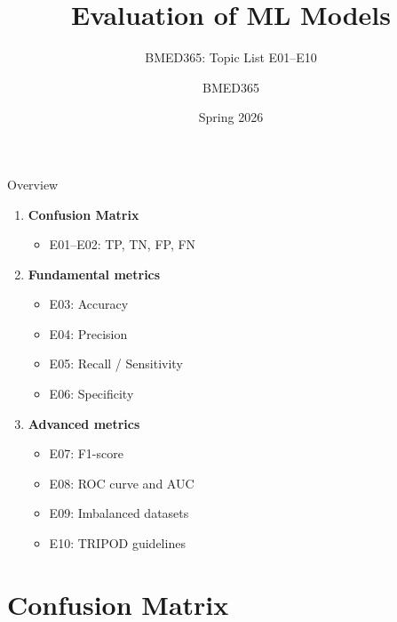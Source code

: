 \documentclass[aspectratio=169, 10pt]{beamer}
\title{Evaluation of ML Models}
\subtitle{BMED365: Topic List E01--E10}
\author{BMED365}
\date{Spring 2026}
\begin{document}
\begin{frame}
    \titlepage
\end{frame}

\begin{frame}{Overview}
    \begin{enumerate}
        \item \textbf{Confusion Matrix}
        \begin{itemize}
            \item E01--E02: TP, TN, FP, FN
        \end{itemize}
        \item \textbf{Fundamental metrics}
        \begin{itemize}
            \item E03: Accuracy
            \item E04: Precision
            \item E05: Recall / Sensitivity
            \item E06: Specificity
        \end{itemize}
        \item \textbf{Advanced metrics}
        \begin{itemize}
            \item E07: F1-score
            \item E08: ROC curve and AUC
            \item E09: Imbalanced datasets
            \item E10: TRIPOD guidelines
        \end{itemize}
    \end{enumerate}
\end{frame}

\section{Confusion Matrix}
\end{document}
